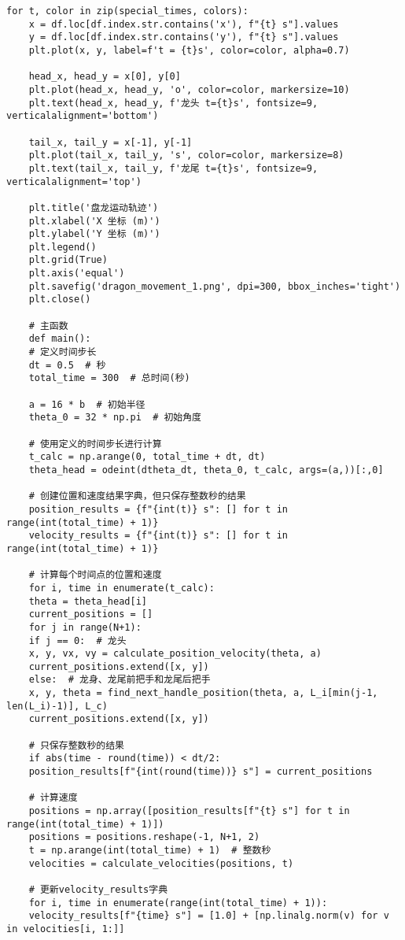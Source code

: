 \begin{lstlisting}[caption={问题一处理代码1}]
	for t, color in zip(special_times, colors):
	x = df.loc[df.index.str.contains('x'), f"{t} s"].values
	y = df.loc[df.index.str.contains('y'), f"{t} s"].values
	plt.plot(x, y, label=f't = {t}s', color=color, alpha=0.7)
	
	head_x, head_y = x[0], y[0]
	plt.plot(head_x, head_y, 'o', color=color, markersize=10)
	plt.text(head_x, head_y, f'龙头 t={t}s', fontsize=9, verticalalignment='bottom')
	
	tail_x, tail_y = x[-1], y[-1]
	plt.plot(tail_x, tail_y, 's', color=color, markersize=8)
	plt.text(tail_x, tail_y, f'龙尾 t={t}s', fontsize=9, verticalalignment='top')
	
	plt.title('盘龙运动轨迹')
	plt.xlabel('X 坐标 (m)')
	plt.ylabel('Y 坐标 (m)')
	plt.legend()
	plt.grid(True)
	plt.axis('equal')
	plt.savefig('dragon_movement_1.png', dpi=300, bbox_inches='tight')
	plt.close()
	
	# 主函数
	def main():
	# 定义时间步长
	dt = 0.5  # 秒
	total_time = 300  # 总时间(秒)
	
	a = 16 * b  # 初始半径
	theta_0 = 32 * np.pi  # 初始角度
	
	# 使用定义的时间步长进行计算
	t_calc = np.arange(0, total_time + dt, dt)
	theta_head = odeint(dtheta_dt, theta_0, t_calc, args=(a,))[:,0]
	
	# 创建位置和速度结果字典，但只保存整数秒的结果
	position_results = {f"{int(t)} s": [] for t in range(int(total_time) + 1)}
	velocity_results = {f"{int(t)} s": [] for t in range(int(total_time) + 1)}
	
	# 计算每个时间点的位置和速度
	for i, time in enumerate(t_calc):
	theta = theta_head[i]
	current_positions = []
	for j in range(N+1):
	if j == 0:  # 龙头
	x, y, vx, vy = calculate_position_velocity(theta, a)
	current_positions.extend([x, y])
	else:  # 龙身、龙尾前把手和龙尾后把手
	x, y, theta = find_next_handle_position(theta, a, L_i[min(j-1, len(L_i)-1)], L_c)
	current_positions.extend([x, y])
	
	# 只保存整数秒的结果
	if abs(time - round(time)) < dt/2:
	position_results[f"{int(round(time))} s"] = current_positions
	
	# 计算速度
	positions = np.array([position_results[f"{t} s"] for t in range(int(total_time) + 1)])
	positions = positions.reshape(-1, N+1, 2)
	t = np.arange(int(total_time) + 1)  # 整数秒
	velocities = calculate_velocities(positions, t)
	
	# 更新velocity_results字典
	for i, time in enumerate(range(int(total_time) + 1)):
	velocity_results[f"{time} s"] = [1.0] + [np.linalg.norm(v) for v in velocities[i, 1:]]
	

\end{lstlisting}
